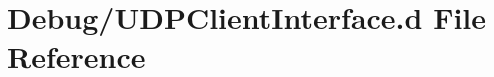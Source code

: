 \hypertarget{Debug_2UDPClientInterface_8d}{}\section{Debug/\+U\+D\+P\+Client\+Interface.d File Reference}
\label{Debug_2UDPClientInterface_8d}
